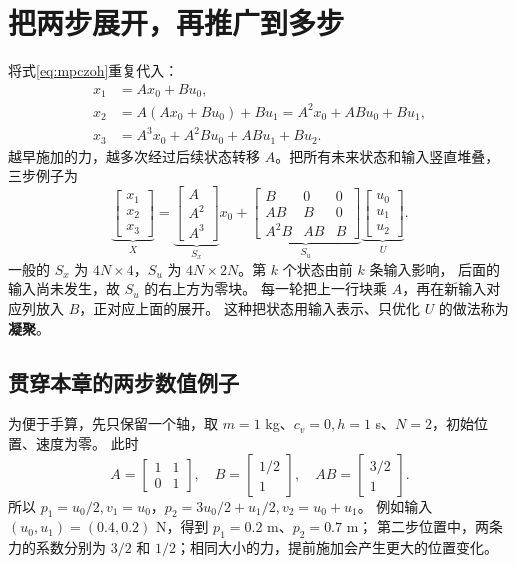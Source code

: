 \section{把两步展开，再推广到多步}
将式\eqref{eq:mpczoh}重复代入：
\begin{align*}
 x_1&=Ax_0+Bu_0,\\
 x_2&=A(Ax_0+Bu_0)+Bu_1=A^2x_0+ABu_0+Bu_1,\\
 x_3&=A^3x_0+A^2Bu_0+ABu_1+Bu_2.
\end{align*}
越早施加的力，越多次经过后续状态转移 $A$。把所有未来状态和输入竖直堆叠，三步例子为
\[
 \underbrace{\begin{bmatrix}x_1\\x_2\\x_3\end{bmatrix}}_X
 =\underbrace{\begin{bmatrix}A\\A^2\\A^3\end{bmatrix}}_{S_x}x_0+
 \underbrace{\begin{bmatrix}B&0&0\\AB&B&0\\A^2B&AB&B\end{bmatrix}}_{S_u}
 \underbrace{\begin{bmatrix}u_0\\u_1\\u_2\end{bmatrix}}_U.
\]
一般的 $S_x$ 为 $4N\times4$，$S_u$ 为 $4N\times2N$。第 $k$ 个状态由前 $k$ 条输入影响，
后面的输入尚未发生，故 $S_u$ 的右上方为零块。
 每一轮把上一行块乘 $A$，再在新输入对应列放入 $B$，正对应上面的展开。
这种把状态用输入表示、只优化 $U$ 的做法称为\textbf{凝聚}。

\subsection{贯穿本章的两步数值例子}
为便于手算，先只保留一个轴，取 $m=1$ kg、$c_v=0,h=1$ s、$N=2$，初始位置、速度为零。
此时
\[
 A=\begin{bmatrix}1&1\\0&1\end{bmatrix},\quad
 B=\begin{bmatrix}1/2\\1\end{bmatrix},\quad
 AB=\begin{bmatrix}3/2\\1\end{bmatrix}.
\]
所以 $p_1=u_0/2,v_1=u_0$，$p_2=3u_0/2+u_1/2,v_2=u_0+u_1$。
例如输入 $(u_0,u_1)=(0.4,0.2)$ N，得到 $p_1=0.2$ m、$p_2=0.7$ m；
第二步位置中，两条力的系数分别为 $3/2$ 和 $1/2$；相同大小的力，提前施加会产生更大的位置变化。

